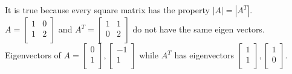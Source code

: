 \documentclass[10pt,twoside,reqno]{article}
\begin{document}
\begin{enumerate}
\begin{center}
It is true because every square matrix has the property $|A|=|A^T|$. \\
\vspace{2mm}
$A=
\begin{bmatrix}
1&0\\
1&2\\
\end{bmatrix}
$
\hspace{4mm} and \hspace{4mm}
$A^T=
\begin{bmatrix}
1&1\\
0&2\\
\end{bmatrix}
$ do not have the same eigen vectors. \\
Eigenvectors of $A=
\begin{bmatrix}
0\\
1\\
\end{bmatrix},
\begin{bmatrix}
-1\\
1\\
\end{bmatrix}
$ while $A^T$ has eigenvectors $
\begin{bmatrix}
1\\
1\\
\end{bmatrix},
\begin{bmatrix}
1\\
0\\
\end{bmatrix}
$. \\
\end{center}


\end{enumerate}
\end{document}
